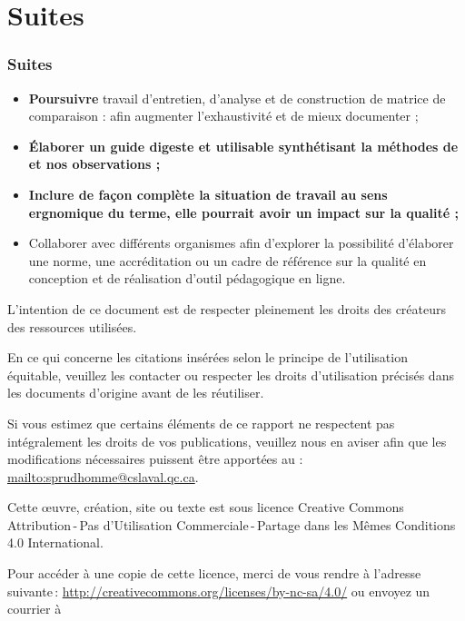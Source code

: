 					\section{Suites} 
						\begin{frame}[allowframebreaks]
						\frametitle{Suites}
                        			
                        			\begin{itemize}
                        			\item \textbf{Poursuivre} travail d’entretien, d’analyse et de construction de matrice de comparaison : afin augmenter l’exhaustivité et de mieux documenter ;
                        			\item \textbf{Élaborer un guide digeste et utilisable synthétisant la méthodes de \citet{bonneau2013a} et nos observations ;}
                        			\item \textbf{Inclure de façon complète la situation de travail au sens ergnomique du terme, elle pourrait avoir un impact sur la qualité ;}
						\item Collaborer avec différents organismes afin d’explorer la possibilité d’élaborer une norme, une accréditation ou un cadre de référence sur la qualité en conception et de réalisation d’outil pédagogique en ligne.
                        				
						\end{itemize}
						\end{frame}									
						
\framebreak
\par L’intention de ce document est de respecter pleinement les droits des créateurs des ressources
utilisées.
	\par En ce qui concerne les citations insérées selon le principe de l'utilisation équitable, veuillez les contacter ou respecter les droits d’utilisation précisés dans les documents d’origine avant de les réutiliser.
	\par Si vous estimez que certains éléments de ce rapport ne respectent pas intégralement les droits de vos
publications, veuillez nous en aviser afin que les modifications nécessaires puissent être apportées au : \url{mailto:sprudhomme@cslaval.qc.ca}.
	\par Cette \oe uvre, création, site ou texte est sous licence Creative Commons Attribution\,-\,Pas d’Utilisation Commerciale\,-\,Partage dans les Mêmes Conditions 4.0 International. \\
	\par 
	 Pour accéder à une copie de cette licence, merci de vous rendre à l'adresse suivante\,: \url{http://creativecommons.org/licenses/by-nc-sa/4.0/} ou envoyez un courrier à 

